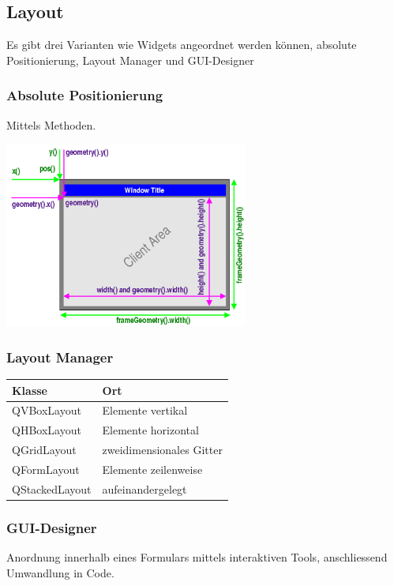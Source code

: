 \subsection{Layout}
Es gibt drei Varianten wie Widgets angeordnet werden können, absolute Positionierung, Layout Manager und GUI-Designer

\subsubsection{Absolute Positionierung}
Mittels Methoden.
\begin{multicols}{2}	
	
	
	\includegraphics[width=8cm]{images/geometry.png}
\end{multicols}

\subsubsection{Layout Manager}
	\begin{tabular}{|l|l|}
		\hline \textbf{Klasse} & \textbf{Ort}\\
		\hline QVBoxLayout & Elemente vertikal\\
		\hline QHBoxLayout & Elemente horizontal\\
		\hline QGridLayout & zweidimensionales Gitter\\
		\hline QFormLayout & Elemente zeilenweise\\
		\hline QStackedLayout & aufeinandergelegt\\
		\hline
	\end{tabular}
	
\subsubsection{GUI-Designer}	
	Anordnung innerhalb eines Formulars mittels interaktiven Tools, anschliessend Umwandlung in Code. 	

